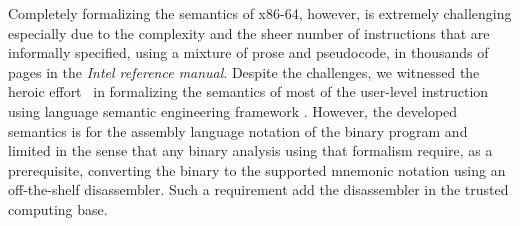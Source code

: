 \documentclass[a4paper,UKenglish,cleveref, autoref]{lipics-v2019}
\begin{document}
Completely formalizing the semantics of x86-64, however, is extremely challenging especially due to the complexity and the sheer number of instructions that are informally specified, using a mixture of prose and pseudocode, in thousands of pages in the \emph{Intel reference manual}. 
Despite the challenges, we witnessed the heroic effort~\cite{Dasgupta:2019} in formalizing the semantics of most of the user-level instruction using language semantic engineering framework \K. However, the developed semantics is for the assembly language notation of the binary program and limited in the sense that any binary analysis using that formalism require, as a prerequisite, converting the binary to the supported mnemonic notation using an off-the-shelf disassembler. Such a requirement add the disassembler in the trusted computing base.  






\end{document}

